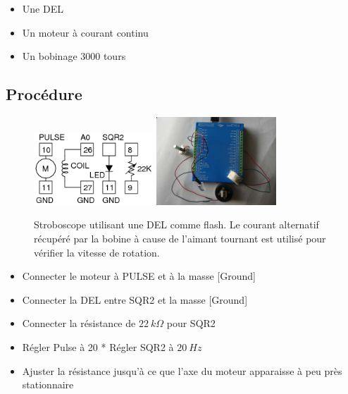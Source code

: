\documentclass{book}
\begin{document}
\begin{itemize}
  \item Une DEL
  \item Un moteur à courant continu
  \item Un bobinage 3000 tours
\end{itemize}

\subsection{Procédure}


\begin{figure}[h!]
\begin{center}
\caption{\label{fig:Stroboscope}Stroboscope utilisant une DEL comme flash. Le courant alternatif récupéré par la bobine à cause de l'aimant tournant est utilisé pour vérifier la vitesse de rotation. }\vspace{0.5em}
\includegraphics[width=0.4\textwidth, height=0.3\textwidth, keepaspectratio]{Schematic-strobo.png}
\includegraphics[width=0.4\textwidth, height=0.3\textwidth, keepaspectratio]{Pic-stroboscope-photo.png}
\end{center}
\end{figure}



\begin{itemize}
  \item Connecter le moteur à PULSE et à la masse [Ground]
  \item Connecter la DEL entre SQR2 et la masse [Ground]
  \item Connecter la résistance de $22\ k\Omega$  pour SQR2
  \item Régler Pulse à 20 * Régler SQR2 à $20\ Hz$
  \item Ajuster la résistance jusqu'à ce que l'axe du moteur apparaisse à peu près stationnaire
\end{itemize}
\end{document}
